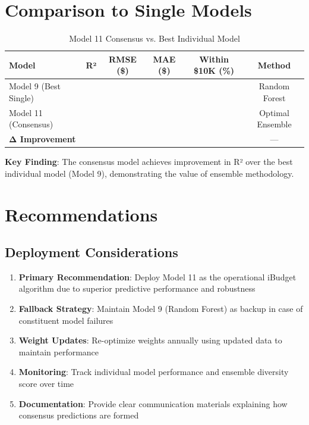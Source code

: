\section{Comparison to Single Models}

\begin{table}[h]
\centering
\caption{Model 11 Consensus vs. Best Individual Model}
\label{tab:model11_vs_best}
\begin{tabular}{lccccc}
\toprule
\textbf{Model} & \textbf{R²} & \textbf{RMSE (\$)} & \textbf{MAE (\$)} & \textbf{Within \$10K (\%)} & \textbf{Method} \\
\midrule
Model 9 (Best Single) & \ModelNineRSquaredTest{} & \ModelNineRMSETest{} & \ModelNineMAETest{} & \ModelNineWithinTenK{} & Random Forest \\
Model 11 (Consensus) & \ModelElevenRSquaredTest{} & \ModelElevenRMSETest{} & \ModelElevenMAETest{} & \ModelElevenWithinTenK{} & Optimal Ensemble \\
\midrule
\textbf{Δ Improvement} & \textbf{\ModelElevenImprovementVsBest{}} & \textbf{\ModelElevenRMSEImprovementVsBest{}} & \textbf{\ModelElevenMAEImprovementVsBest{}} & \textbf{\ModelElevenAccuracyImprovementVsBest{}} & --- \\
\bottomrule
\end{tabular}
\end{table}

\textbf{Key Finding}: The consensus model achieves \ModelElevenImprovementVsBest{} improvement in R² over the best individual model (Model 9), demonstrating the value of ensemble methodology.

\section{Recommendations}

\subsection{Deployment Considerations}

\begin{enumerate}
    \item \textbf{Primary Recommendation}: Deploy Model 11 as the operational iBudget algorithm due to superior predictive performance and robustness
    
    \item \textbf{Fallback Strategy}: Maintain Model 9 (Random Forest) as backup in case of constituent model failures
    
    \item \textbf{Weight Updates}: Re-optimize weights annually using updated data to maintain performance
    
    \item \textbf{Monitoring}: Track individual model performance and ensemble diversity score over time
    
    \item \textbf{Documentation}: Provide clear communication materials explaining how consensus predictions are formed
\end{enumerate}

